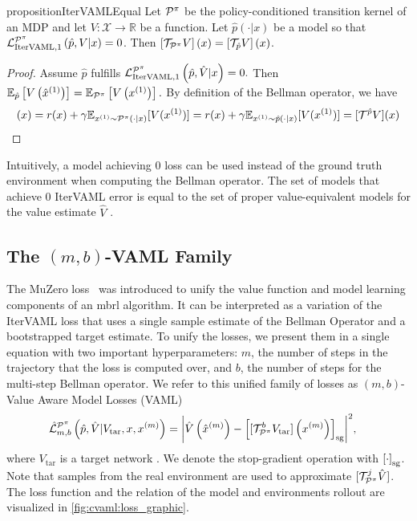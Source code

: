 \begin{restatable}{proposition}{IterVAMLEqual}{\textcite{itervaml}}\label{prop:cvaml:1_1}
    Let $\P^\pi$ be the policy-conditioned transition kernel of an MDP and let $V: \mathcal{X} \rightarrow \mathbb{R}$ be a function.
    Let $\hat{p}(\cdot|x)$ be a model so that ${\mathcal{L}}^{\P^\pi}_{\mathrm{IterVAML}, 1}\left(\hat{p},V|x\right) = 0$.
    Then $\squareb{\mathcal{T}_{\P^\pi} V }(x) = \squareb{\mathcal{T}_{\hat{p}} V }(x)$.
\end{restatable}
\begin{proof}
    Assume $\hat{p}$ fulfills ${\mathcal{L}}^{\P^\pi}_{\mathrm{IterVAML}, 1}\left(\hat{p},\hat{V}|x\right) = 0.$ Then $\mathbb{E}_{\hat{p}}\left[V\left(\hat{x}^{(1)}\right)\right] = \mathbb{E}_{\P^\pi}\left[V\left(x^{(1)}\right)\right].$ By definition of the Bellman operator, we have
    \begin{align}
        [\mathcal{T}^{\P^\pi} V](x) = r(x) + \gamma \mathbb{E}_{x^{(1)}\sim \P^\pi(\cdot|x)}[V(x^{(1)})] = r(x) + \gamma \mathbb{E}_{x^{(1)}\sim \hat{p}(\cdot|x)}[V(x^{(1)})] = [\mathcal{T}^{\hat{p}}V](x)
    \end{align}
\end{proof}

Intuitively, a model achieving $0$ loss can be used instead of the ground truth environment when computing the Bellman operator.
The set of models that achieve $0$ IterVAML error is equal to the set of proper value-equivalent models for the value estimate $\hat{V}$ \cite{grimm2021proper}.

\subsection{The $(m,b)$-VAML Family}
The MuZero loss~\parencite{schrittwieser2020mastering} was introduced to unify the value function and model learning components of an \ac{mbrl} algorithm.
It can be interpreted as a variation of the IterVAML loss that uses a single sample estimate of the Bellman Operator and a bootstrapped target estimate. 
To unify the losses, we present them in a single equation with two important hyperparameters: $m$, the number of steps in the trajectory that the loss is computed over, and $b$, the number of steps for the multi-step Bellman operator.
We refer to this unified family of losses as $(m,b)$-Value Aware Model Losses (VAML)
\begin{align}
    & \hat{\mathcal{L}}^{\P^\pi}_{m,b}\left(\hat{p},\hat{V}|V_\mathrm{tar},x, x^{(m)}\right) = \biggl|\hat{V}\roundb{\hat{x}^{(m)}} - 
    \squareb{[\mathcal{T}_{\P^\pi}^b V_\mathrm{tar}]\roundb{x^{(m)}}}_\mathrm{sg}\biggr|^2, \label{eq:cvaml:dal_loss}
\end{align}
where $V_\mathrm{tar}$ is a target network \parencite{mnih2013playing}.
We denote the stop-gradient operation with $\squareb{\cdot}_\mathrm{sg}$.
Note that samples from the real environment are used to approximate $[\mathcal{T}_{\P^\pi}^j \hat{V}]$.
The loss function and the relation of the model and environments rollout are visualized in \autoref{fig:cvaml:loss_graphic}.

